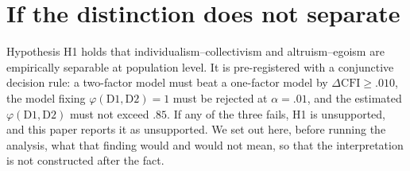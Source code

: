 
\section{If the distinction does not separate}\label{sec:negative}


Hypothesis H1 holds that individualism--collectivism and altruism--egoism are
empirically separable at population level. It is pre-registered with a
conjunctive decision rule: a two-factor model must beat a one-factor model by
$\Delta\mathrm{CFI} \geq .010$, the model fixing $\varphi(\mathrm{D1},
\mathrm{D2}) = 1$ must be rejected at $\alpha = .01$, and the estimated
$\varphi(\mathrm{D1}, \mathrm{D2})$ must not exceed $.85$. If any of the three
fails, H1 is unsupported, and this paper reports it as unsupported. We set out
here, before running the analysis, what that finding would and would not mean,
so that the interpretation is not constructed after the fact.

